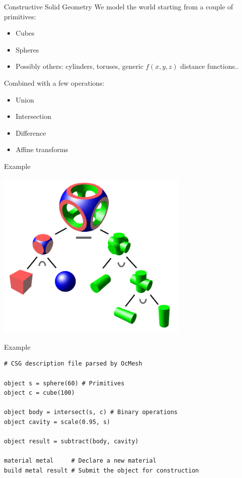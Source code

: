 \documentclass[utf8x]{beamer}
\begin{document}
\begin{frame}{Constructive Solid Geometry}
We model the world starting from a couple of primitives:
\begin{itemize}
\item Cubes
\item Spheres
\item Possibly others: cylinders, toruses, generic $f(x,y,z)$ distance 
      functions..
\end{itemize}
Combined with a few operations:
\begin{itemize}
\item Union
\item Intersection
\item Difference
\item Affine transforms
\end{itemize}
\end{frame}

\begin{frame}{Example}
\begin{center}
\includegraphics[width=0.7\textwidth]{wikicsg}
\end{center}
\end{frame}

\begin{frame}[fragile]{Example}
\begin{lstlisting}
# CSG description file parsed by OcMesh

object s = sphere(60) # Primitives
object c = cube(100)

object body = intersect(s, c) # Binary operations
object cavity = scale(0.95, s)

object result = subtract(body, cavity)

material metal     # Declare a new material
build metal result # Submit the object for construction
\end{lstlisting}
\end{frame}
\end{document}
